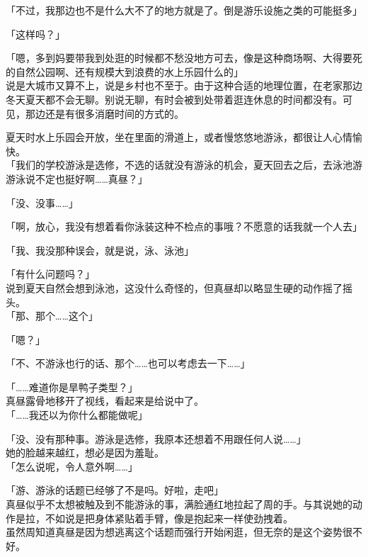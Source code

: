 「不过，我那边也不是什么大不了的地方就是了。倒是游乐设施之类的可能挺多」

「这样吗？」

「嗯，多到妈要带我到处逛的时候都不愁没地方可去，像是这种商场啊、大得要死的自然公园啊、还有规模大到浪费的水上乐园什么的」\\

说是大城市又算不上，说是乡村也不至于。由于这种合适的地理位置，在老家那边冬天夏天都不会无聊。别说无聊，有时会被到处带着逛连休息的时间都没有。可见，那边还是有很多消磨时间的方式的。

夏天时水上乐园会开放，坐在里面的滑道上，或者慢悠悠地游泳，都很让人心情愉快。\\

「我们的学校游泳是选修，不选的话就没有游泳的机会，夏天回去之后，去泳池游游泳说不定也挺好啊……真昼？」

「没、没事……」

「啊，放心，我没有想着看你泳装这种不检点的事哦？不愿意的话我就一个人去」

「我、我没那种误会，就是说，泳、泳池」

「有什么问题吗？」\\

说到夏天自然会想到泳池，这没什么奇怪的，但真昼却以略显生硬的动作摇了摇头。\\

「那、那个……这个」

「嗯？」

「不、不游泳也行的话、那个……也可以考虑去一下……」

「……难道你是旱鸭子类型？」\\

真昼露骨地移开了视线，看起来是给说中了。\\

「……我还以为你什么都能做呢」

「没、没有那种事。游泳是选修，我原本还想着不用跟任何人说……」\\

她的脸越来越红，想必是因为羞耻。\\

「怎么说呢，令人意外啊……」

「游、游泳的话题已经够了不是吗。好啦，走吧」\\

真昼似乎不太想被触及到不能游泳的事，满脸通红地拉起了周的手。与其说她的动作是拉，不如说是把身体紧贴着手臂，像是抱起来一样使劲拽着。\\

虽然周知道真昼是因为想逃离这个话题而强行开始闲逛，但无奈的是这个姿势很不好。\\

